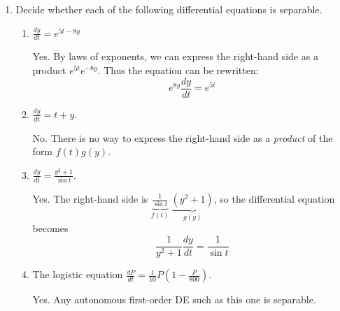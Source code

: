 \documentclass[main]{subfiles}
\begin{document}
\begin{enumerate}


  \item   \label{identify-separable}
  Decide whether each of the following differential equations is
  separable. 
  \begin{enumerate}      

    \item 
    \begin{problem}[0.5in]
      $\displaystyle \frac{dy}{dt} = e^{5t - 8y}$
    \end{problem}

    \begin{solution}
      Yes.  By laws of exponents, we can express the right-hand side as a product $e^{5t} e^{-8y}$. Thus the equation can be rewritten:
      \[e^{8y}\frac{dy}{dt} = e^{5t}\]
    \end{solution}

    \item
    \begin{problem}[0.5in]
    $\displaystyle \frac{dy}{dt} = t + y$.
    \end{problem}

    \begin{solution}
    No.  There is no way to express the right-hand side as a {\em product} 
    of the form $f(t) g(y)$.
    \end{solution}
    
    \item
    \begin{problem}[0.5in]
    $\displaystyle \frac{dy}{dt} = \frac{y^2 + 1}{\sin t}$.
    \end{problem}

    \begin{solution}
    Yes.  The right-hand side is $\displaystyle \underbrace{\frac{1}{\sin t}}_{f(t)} \: \underbrace{(y^2 + 1)}_{g(y)}$, so the differential equation becomes
    \[\frac{1}{y^2 + 1}\frac{dy}{dt} = \frac{1}{\sin t}\]
    \end{solution}
    
    \item
    \begin{problem}[1in]
    The logistic equation $\displaystyle \frac{dP}{dt} = \frac{1}{10} P \left( 1 - \frac{P}{800} \right)$.
    \end{problem}

    \begin{solution}
    Yes.  Any autonomous first-order DE such as this one is separable.
    \end{solution}
    

\end{enumerate}
\end{enumerate}
\end{document}
